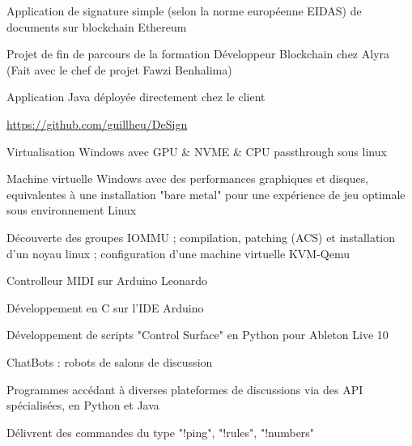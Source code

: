 \begin{cventries}
    {} %
    {} %
    {
      \begin{cvitems} %
        \item {Application de signature simple (selon la norme européenne EIDAS) de documents sur blockchain Ethereum}
        \item {Projet de fin de parcours de la formation Développeur Blockchain chez Alyra (Fait avec le chef de projet Fawzi Benhalima)}
        \item {Application Java déployée directement chez le client}
        \item {\href{https://github.com/guillheu/DeSign}{https://github.com/guillheu/DeSign}}
      \end{cvitems}
    }
 
  \cventry
    {} %
    {Virtualisation Windows avec GPU \& NVME \& CPU passthrough sous linux} %
    {} %
    {} %
    {
      \begin{cvitems} %
        \item {Machine virtuelle Windows avec des performances graphiques et disques, equivalentes à une installation "bare metal" pour une expérience de jeu optimale sous environnement Linux}
        \item {Découverte des groupes IOMMU ; compilation, patching (ACS) et installation d'un noyau linux ; configuration d'une machine virtuelle KVM-Qemu\\}
      \end{cvitems}
    }
  \cventry
    {} %
    {Controlleur MIDI sur Arduino Leonardo} %
    {} %
    {} %
    {
      \begin{cvitems} %
        \item {Développement en C sur l'IDE Arduino}
        \item {Développement de scripts "Control Surface" en Python pour Ableton Live 10\\}
      \end{cvitems}
    }
  \cventry
    {} %
    {ChatBots : robots de salons de discussion} %
    {} %
    {} %
    {
      \begin{cvitems} %
        \item {Programmes accédant à diverses plateformes de discussions via des API spécialisées, en Python et Java}
        \item {Délivrent des commandes du type "!ping", "!rules", "!numbers"}

\end{cvitems}}
\end{cventries}
